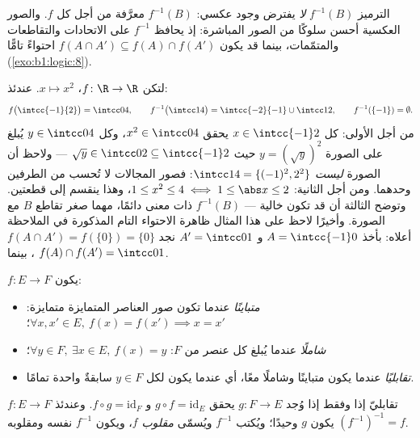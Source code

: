 \begin{remark}
الترميز $f^{-1}(B)$ \emph{لا} يفترض وجود  عكسي:  $f^{-1}(B)$ معرَّفة من أجل كل $f$. والصور العكسية أحسن سلوكًا من
الصور المباشرة: إذ يحافظ $f^{-1}$ على الاتحادات والتقاطعات
والمتمّمات، بينما قد يكون $f(A \cap A') \subseteq f(A) \cap f(A')$ احتواءً تامًّا
(\cref{exo:b1:logic:8}).
\end{remark}

\begin{example}\label{ex:b1:logic:images}
لتكن $f \colon \R \to \R$، $x \mapsto x^2$. عندئذ:
\[
f\bigl(\intcc{-1}{2}\bigr) = \intcc04, \qquad
f^{-1}\bigl(\intcc14\bigr) = \intcc{-2}{-1} \cup \intcc12, \qquad
f^{-1}(\{-1\}) = \emptyset .
\]
من أجل الأولى: كل $x \in \intcc{-1}2$ يحقق $x^2 \in \intcc04$، وكل
$y \in \intcc04$ يُبلغ على الصورة $y = (\sqrt y)^2$ حيث $\sqrt y
\in \intcc02 \subseteq \intcc{-1}2$ --- ولاحظ أن الصورة
\emph{ليست} $\intcc14 = \{(-1)^2, 2^2\}$: فصور المجالات لا
تُحسب من الطرفين وحدهما. ومن أجل الثانية: $1 \leq x^2 \leq 4 \iff
1 \leq \abs x \leq 2$، وهذا ينقسم إلى قطعتين. وتوضح الثالثة
أن  قد تكون خالية ---  $f^{-1}(B)$ ذات معنى دائمًا،
مهما صغر تقاطع $B$ مع الصورة. وأخيرًا لاحظ على هذا المثال ظاهرة
الاحتواء التام المذكورة في الملاحظة أعلاه: بأخذ $A = \intcc{-1}0$
و $A' = \intcc01$ نجد $f(A \cap A') =
f(\{0\}) = \{0\}$، بينما $f(A) \cap f(A') = \intcc01$.
\end{example}

\begin{definition}\label{def:b1:logic:inj}
 $f \colon E \to F$ يكون:
\begin{itemize}
  \item \emph{متباينًا} عندما تكون صور العناصر
        المتمايزة متمايزة: $\forall x, x' \in E,\ f(x) = f(x') \implies
        x = x'$؛
  \item \emph{شاملًا} عندما يُبلغ كل عنصر من $F$:
        $\forall y \in F,\ \exists x \in E,\ f(x) = y$؛
  \item \emph{تقابليًا} عندما يكون متباينًا
        وشاملًا معًا، أي عندما يكون لكل $y \in F$ سابقةٌ واحدة تمامًا.
\end{itemize}
\end{definition}

\begin{theorem}\label{thm:b1:logic:inverse}
 $f \colon E \to F$ تقابليّ إذا وفقط إذا وُجد 
$g \colon F \to E$ يحقق $g \circ f = \mathrm{id}_E$ و $f \circ g =
\mathrm{id}_F$. وعندئذ يكون $g$ وحيدًا؛ ويُكتب $f^{-1}$ ويُسمّى
\emph{مقلوب} $f$، ويكون $f^{-1}$ نفسه  ومقلوبه
$(f^{-1})^{-1} = f$.
\end{theorem}

